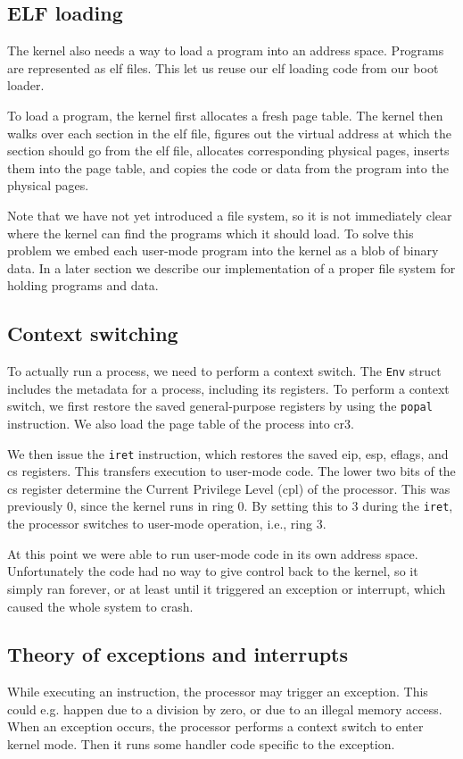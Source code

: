 \documentclass{article}
\begin{document}
\subsection{ELF loading}
The kernel also needs a way to load a program into an address space. Programs
are represented as \gls{elf} files. This let us reuse our \gls{elf} loading code from our
boot loader.

To load a program, the kernel first allocates a fresh page table. The kernel
then walks over each section in the \gls{elf} file, figures out the virtual address
at which the section should go from the \gls{elf} file, allocates corresponding
physical pages, inserts them into the page table, and copies the code or data
from the program into the physical pages.

Note that we have not yet introduced a file system, so it is not immediately
clear where the kernel can find the programs which it should load. To solve
this problem we embed each user-mode program into the kernel as a blob of
binary data. In a later section we describe our implementation of a proper
file system for holding programs and data.

\subsection{Context switching}
To actually run a process, we need to perform a context switch. The
\texttt{Env} struct includes the metadata for a process, including its
registers. To perform a context switch, we first restore the saved
general-purpose registers by using the \texttt{popal} instruction. We also
load the page table of the process into \gls{cr3}.

We then issue the \texttt{iret} instruction, which restores the saved
\gls{eip}, \gls{esp}, \gls{eflags}, and \gls{cs} registers. This transfers
execution to user-mode code. The lower two bits of the \gls{cs} register
determine the Current Privilege Level (\gls{cpl}) of the processor. This was
previously 0, since the kernel runs in ring 0. By setting this to 3 during the
\texttt{iret}, the processor switches to user-mode operation, i.e., ring 3.

At this point we were able to run user-mode code in its own address space.
Unfortunately the code had no way to give control back to the kernel, so it
simply ran forever, or at least until it triggered an exception or interrupt,
which caused the whole system to crash.


\subsection{Theory of exceptions and interrupts}
While executing an instruction, the processor may trigger an exception. This
could e.g. happen due to a division by zero, or due to an illegal memory
access. When an exception occurs, the processor performs a context switch to
enter kernel mode. Then it runs some handler code specific to the exception.
\end{document}

